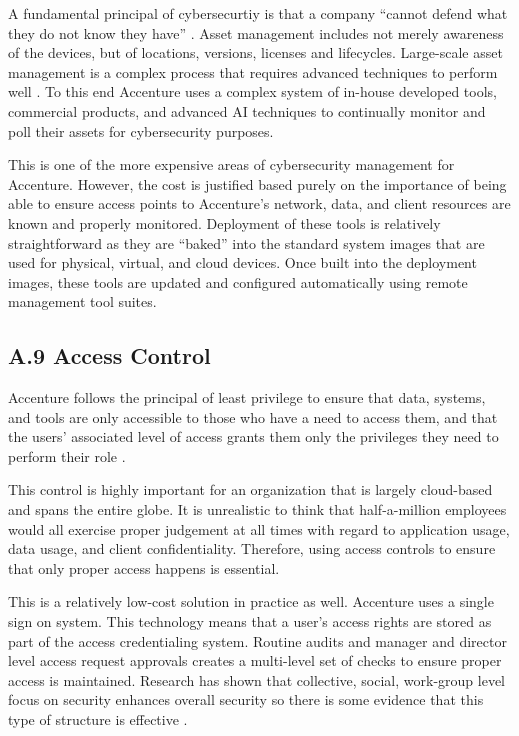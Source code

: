 A fundamental principal of cybersecurtiy is that a company ``cannot defend what they do not know they have'' \parencite{centerforinternetsecurityCenterInternetSecurity2021}. Asset management includes not merely awareness of the devices, but of locations, versions, licenses and lifecycles. Large-scale asset management is a complex process that requires advanced techniques to perform well \parencite{halimaibrahimkureAssetsFocusRisk2019}. To this end Accenture uses a complex system of in-house developed tools, commercial products, and advanced AI techniques to continually monitor and poll their assets for cybersecurity purposes.

This is one of the more expensive areas of cybersecurity management for Accenture. However, the cost is justified based purely on the importance of being able to ensure access points to Accenture's network, data, and client resources are known and properly monitored. Deployment of these tools is relatively straightforward as they are ``baked'' into the standard system images that are used for physical, virtual, and cloud devices. Once built into the deployment images, these tools are updated and configured automatically using remote management tool suites.

\subsection{A.9 Access Control}

Accenture follows the principal of least privilege to ensure that data, systems, and tools are only accessible to those who have a need to access them, and that the users' associated level of access grants them only the privileges they need to perform their role \parencite{centerforinternetsecurityCenterInternetSecurity2021,jillepalliHardeningClientSideGuide2017}.

This control is highly important for an organization that is largely cloud-based and spans the entire globe. It is unrealistic to think that half-a-million employees would all exercise proper judgement at all times with regard to application usage, data usage, and client confidentiality. Therefore, using access controls to ensure that only proper access happens is essential.

This is a relatively low-cost solution in practice as well. Accenture uses a single sign on system. This technology means that a user's access rights are stored as part of the access credentialing system. Routine audits and manager and director level access request approvals creates a multi-level set of checks to ensure proper access is maintained. Research has shown that collective, social, work-group level focus on security enhances overall security so there is some evidence that this type of structure is effective \parencite{chulwooyooCybersecurityTeamSport2020}.


